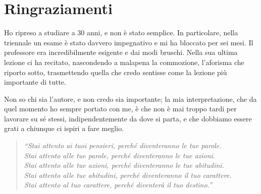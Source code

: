 
\clearpage
\chapter*{Ringraziamenti}
\thispagestyle{empty}
\markboth{}{}

Ho ripreso a studiare a 30 anni, e non è stato semplice. In particolare,
nella triennale un esame è stato davvero impegnativo e mi ha bloccato per
sei mesi. Il professore era incredibilmente esigente e dai modi bruschi.
Nella sua ultima lezione ci ha recitato, nascondendo a malapena la
commozione, l'aforisma che riporto sotto, trasmettendo quella che credo
sentisse come la lezione più importante di tutte.

Non so chi sia l'autore, e non credo sia importante; la mia
interpretazione, che da quel momento ho sempre portato con me, è che non è
mai troppo tardi per lavorare su sé stessi, indipendentemente da dove si
parta, e che dobbiamo essere grati a chiunque ci ispiri a fare meglio.

\begin{quote}
\itshape
``Stai attento ai tuoi pensieri, perché diventeranno le tue parole.\\
Stai attento alle tue parole, perché diventeranno le tue azioni.\\
Stai attento alle tue azioni, perché diventeranno le tue abitudini.\\
Stai attento alle tue abitudini, perché diventeranno il tuo carattere.\\
Stai attento al tuo carattere, perché diventerà il tuo destino.''
\end{quote}
